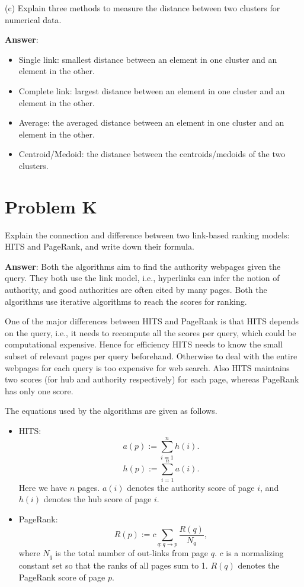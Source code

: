\documentclass{article}
\begin{document}
(c) Explain three methods to measure the distance between two clusters for numerical data.

{\bf Answer}:
\begin{itemize}
\item Single link: smallest distance between an element in one cluster and an element in the other.
\item Complete link: largest distance between an element in one cluster and an element in the other.
\item Average: the averaged distance between an element in one cluster and an element in the other.
\item Centroid/Medoid: the distance between the centroids/medoids of the two clusters.
\end{itemize}

\section{Problem K}
Explain the connection and difference between two link-based ranking models: HITS and PageRank, and write down their formula.

{\bf Answer}:
Both the algorithms aim to find the authority webpages given the query. They both use the link model, i.e., hyperlinks can infer the notion of authority, and good authorities are often cited by many pages. Both the algorithms use iterative algorithms to reach the scores for ranking.

One of the major differences between HITS and PageRank is that HITS depends on the query, i.e., it needs to recompute all the scores per query, which could be computational expensive. Hence for efficiency HITS needs to know the small subset of relevant pages per query beforehand. Otherwise to deal with the entire webpages for each query is too expensive for web search. Also HITS maintains two scores (for hub and authority respectively) for each page, whereas PageRank has only one score. 

The equations used by the algorithms are given as follows.
\begin{itemize}
\item HITS:
$$a(p) := \sum_{i=1}^n h(i).$$
$$h(p) := \sum_{i=1}^n a(i).$$
Here we have $n$ pages. $a(i)$ denotes the authority score of page $i$, and $h(i)$ denotes the hub score of page $i$.

\item PageRank:
$$R(p) := c \sum_{q: q \to p} \frac{R(q)}{N_q},$$
where $N_q$ is the total number of out-links from page $q$. $c$ is a normalizing constant set so that the ranks of all pages sum to 1. $R(q)$ denotes the PageRank score of page $p$.
\end{itemize}
\end{document}
